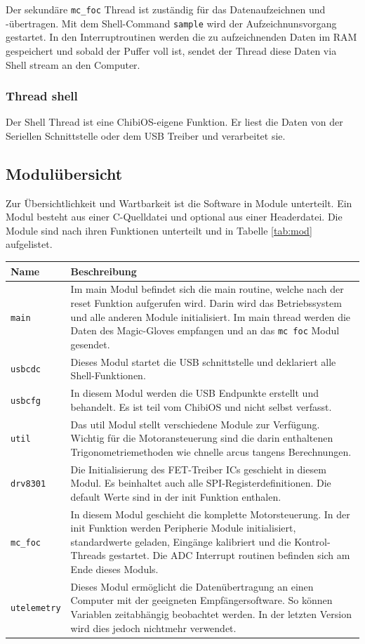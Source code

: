 Der sekundäre \texttt{mc\_foc} Thread ist zuständig für das Datenaufzeichnen und -übertragen. Mit dem Shell-Command \texttt{sample} wird der Aufzeichnunsvorgang gestartet. In den Interruptroutinen werden die zu aufzeichnenden Daten im RAM gespeichert und sobald der Puffer voll ist, sendet der Thread diese Daten via Shell stream an den Computer.

\subsubsection*{Thread shell}
Der Shell Thread ist eine ChibiOS-eigene Funktion. Er liest die Daten von der Seriellen Schnittstelle oder dem USB Treiber und verarbeitet sie.

\subsection*{Modulübersicht}
Zur Übersichtlichkeit und Wartbarkeit ist die Software in Module unterteilt. Ein Modul besteht aus einer C-Quelldatei und optional aus einer Headerdatei. Die Module sind nach ihren Funktionen unterteilt und in Tabelle \ref{tab:mod} aufgelistet.\\
\begin{tabularx}{\textwidth}{l|X}
	Name & Beschreibung \\ \hline
	\texttt{main} & Im main Modul befindet sich die main routine, welche nach der reset Funktion aufgerufen wird. Darin wird das Betriebssystem und alle anderen Module initialisiert. Im main thread werden die Daten des Magic-Gloves empfangen und an das \texttt{mc foc} Modul gesendet. \\ \hline
	\texttt{usbcdc} & Dieses Modul startet die USB schnittstelle und deklariert alle Shell-Funktionen. \\ \hline
	\texttt{usbcfg} & In diesem Modul werden die USB Endpunkte erstellt und behandelt. Es ist teil vom ChibiOS und nicht selbst verfasst. \\ \hline
	\texttt{util} & Das util Modul stellt verschiedene Module zur Verfügung. Wichtig für die Motoransteuerung sind die darin enthaltenen Trigonometriemethoden wie chnelle arcus tangens Berechnungen. \\ \hline
	\texttt{drv8301} & Die Initialisierung des FET-Treiber ICs geschieht in diesem Modul. Es beinhaltet auch alle SPI-Registerdefinitionen. Die default Werte sind in der init Funktion enthalen. \\ \hline
	\texttt{mc\_foc} & In diesem Modul geschieht die komplette Motorsteuerung. In der init Funktion werden Peripherie Module initialisiert, standardwerte geladen, Eingänge kalibriert und die Kontrol-Threads gestartet. Die ADC Interrupt routinen befinden sich am Ende dieses Moduls.\\ \hline
	\texttt{utelemetry} & Dieses Modul ermöglicht die Datenübertragung an einen Computer mit der geeigneten Empfängersoftware. So können Variablen zeitabhängig beobachtet werden. In der letzten Version wird dies jedoch nichtmehr verwendet. \\ \hline
\end{tabularx}
\label{tab:mod}

